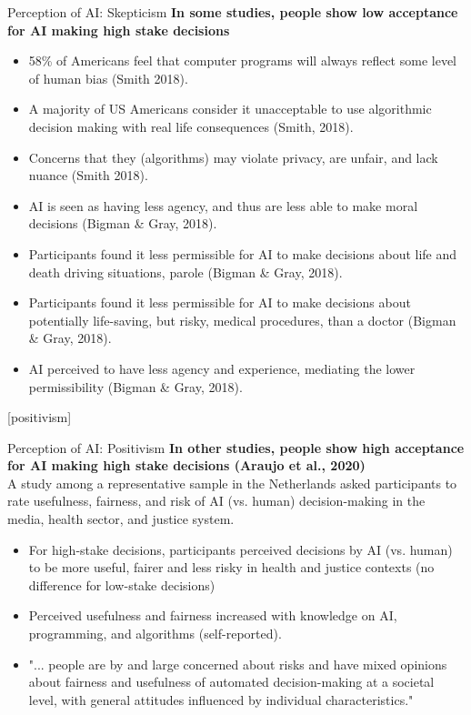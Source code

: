 \documentclass[8pt]{beamer}
\begin{document}
	\begin{frame}[t]{Perception of AI: Skepticism}
		\textbf{In some studies, people show low acceptance for AI making high stake decisions}
		\begin{itemize}
			\item 58\% of Americans feel that computer programs will always reflect some level of human bias (Smith 2018).
			\item A majority of US Americans consider it unacceptable to use algorithmic decision making with real life consequences (Smith, 2018).
			\item Concerns that they (algorithms) may violate privacy, are unfair, and lack nuance (Smith 2018).
			\item AI is seen as having less agency, and thus are less able to make moral decisions (Bigman \& Gray, 2018).
			\item Participants found it less permissible for AI to make decisions about life and death driving situations, parole (Bigman \& Gray, 2018).
			\item Participants found it less permissible for AI to make decisions about potentially life-saving, but risky, medical procedures, than a doctor (Bigman \& Gray, 2018).
			\item AI perceived to have less agency and experience, mediating the lower permissibility (Bigman \& Gray, 2018).
		\end{itemize}
	\end{frame}

	[positivism]

	\begin{frame}[t]{Perception of AI: Positivism}
		\textbf{In other studies, people show high acceptance for AI making high stake decisions (Araujo et al., 2020)}\\
		A study among a representative sample in the Netherlands asked participants to rate usefulness, fairness, and risk of AI (vs. human) decision-making in the media, health sector, and justice system.
		\begin{itemize}
			\item For high-stake decisions, participants perceived decisions by AI (vs. human) to be more useful, fairer and less risky in health and justice contexts (no difference for low-stake decisions)
			\item Perceived usefulness and fairness increased with knowledge on AI, programming, and algorithms (self-reported).
			\item "... people are by and large concerned about risks and have mixed opinions about fairness and usefulness of automated decision-making at a societal level, with general attitudes influenced by individual characteristics."
		\end{itemize}
	\end{frame}
\end{document}
